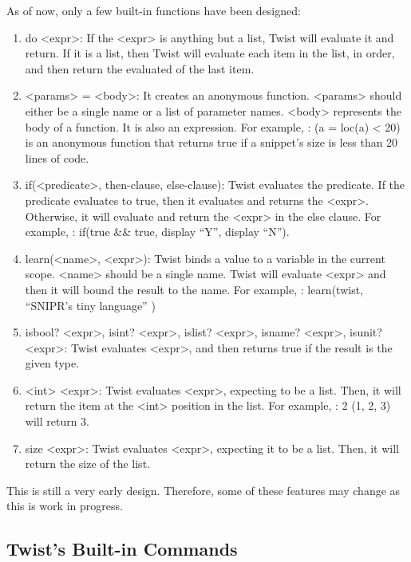 As of now, only a few built-in functions have been designed:

\begin{enumerate}
	\item do <expr>: If the <expr> is anything but a list, Twist will evaluate it and 
	return. If it is a list, then Twist will evaluate each item in the list, in order, 
	and then return the evaluated of the last item.
	
	\item <params> = <body>: It creates an anonymous function. <params> should either be 
	a single name or a list of parameter names. <body> represents the body of a 
	function. It is also an expression. For example, : (a = loc(a) < 20) is an 
	anonymous function that returns true if a snippet's size is less than 20 lines of 
	code. 
	
	\item if(<predicate>, then-clause, else-clause): Twist evaluates the predicate. If 
	the predicate evaluates to true, then it evaluates and returns the <expr>. Otherwise, 
	it will evaluate and return the <expr> in the else clause. For example, : if(true 
	\&\& true, display ``Y'', display ``N'').
	
	\item learn(<name>, <expr>): Twist binds a value to a variable in the current scope. 
	<name> should be a single name. Twist will evaluate <expr> and then it will bound the 
	result to the name. For example, : learn(twist, ``SNIPR's tiny language'' )
   
	\item isbool? <expr>, isint? <expr>, islist? <expr>, isname? <expr>, isunit? <expr>: Twist 
	evaluates <expr>, and then returns true if the result is the given type.
 	
	\item <int> <expr>: Twist evaluates <expr>, expecting to be a list. Then, it will 
	return the item at the <int> position in the list. For example, : 2 (1, 2, 3) will 
	return 3.
	
	\item size <expr>: Twist evaluates <expr>, expecting it to be a list. Then, it will 
	return the size of the list.
\end{enumerate}

This is still a very early design. Therefore, some of these features may change as this 
is work in progress.

\subsection{Twist's Built-in Commands}
\label{sec:retargetingops}

